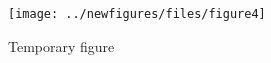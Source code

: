 \documentclass[11pt,letter]{article}
\begin{document}

\begin{figure}
	\centering
	\texttt{[image: ../newfigures/files/figure4]}
	\caption{Temporary figure}
	\label{fig:manag}
\end{figure}
\end{document}
